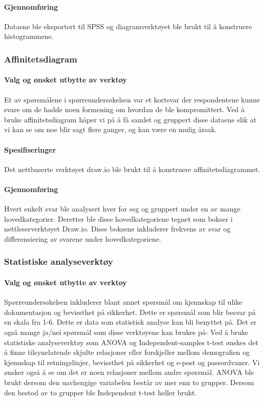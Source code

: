 \paragraph{Gjennomføring}
Dataene ble eksportert til SPSS og diagramverktøyet ble brukt til å konstruere histogrammene.


\subsubsection{Affinitetsdiagram}

\paragraph{Valg og ønsket utbytte av verktøy}
Et av spørsmålene i spørreundersøkelsen var et kortsvar der respondentene kunne svare om de hadde noen formening om hvordan de ble kompromittert. Ved å bruke affinitetsdiagram håper vi på å få samlet og gruppert disse dataene slik at vi kan se om noe blir sagt flere ganger, og kan være en mulig årsak. 

\paragraph{Spesifiseringer}
Det nettbaserte verktøyet draw.io ble brukt til å konstruere affinitetsdiagrammet. 

\paragraph{Gjennomføring}
Hvert enkelt svar ble analysert hver for seg og gruppert under en av mange hovedkategorier. Deretter ble disse hovedkategoriene tegnet som bokser i nettleserverktøyet Draw.io. Disse boksene inkluderer frekvens av svar og differensiering av svarene under hovedkategoriene. 


\subsubsection{Statistiske analyseverktøy}

\paragraph{Valg og ønsket utbytte av verktøy}
Spørreundersøkelsen inkluderer blant annet spørsmål om kjennskap til ulike dokumentasjon og bevissthet på sikkerhet. Dette er spørsmål som blir besvar på en skala fra 1-6. Dette er data som statistisk analyse kan bli benyttet på. Det er også mange ja/nei spørsmål som disse verktøyene kan brukes på- Ved å bruke statistiske analyseverktøy som ANOVA og Independent-samples t-test ønskes det å finne tilsynelatende skjulte relasjoner eller forskjeller mellom demografien og kjennskap til retningslinjer, bevissthet på sikkerhet og e-post og passordvaner. Vi ønsker også å se om det er noen relasjoner mellom andre spørsmål. ANOVA ble brukt dersom den uavhengige variabelen består av mer enn to grupper. Dersom den bestod av to grupper ble Independent t-test heller brukt.

